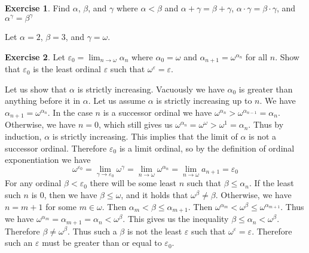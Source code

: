\documentclass{article}
\theoremstyle{definition}
\newtheorem{exer}{Exercise}[section]
\newlength{\defparindent}
\newenvironment{answer}
    {\begin{mdframed}[backgroundcolor=gray!15, linewidth=0pt] \setlength{\parindent}{\defparindent}}
    {\end{mdframed}}
\begin{document}
\begin{exer}
    Find $\alpha$, $\beta$, and $\gamma$ where 
    $\alpha < \beta$ and $\alpha + \gamma = \beta + \gamma$, $\alpha \cdot \gamma = \beta \cdot \gamma$, and $\alpha^\gamma = \beta^\gamma$
    \begin{answer}
        Let $\alpha = 2$, $\beta = 3$, and $\gamma = \omega$.
    \end{answer}
\end{exer}

\begin{exer}
    Let $\varepsilon_0 = \lim_{n \to \omega} \alpha_n$ where $\alpha_0 = \omega$ and $\alpha_{n + 1} = \omega^{\alpha_n}$ for all $n$. Show that $\varepsilon_0$ is the least ordinal $\varepsilon$ such that $\omega^\varepsilon = \varepsilon$.
    \begin{answer}
        Let us show that $\alpha$ is strictly increasing. Vacuously we have $\alpha_0$ is greater than anything before it in $\alpha$. Let us assume $\alpha$ is strictly increasing up to $n$. We have $\alpha_{n + 1} = \omega^{\alpha_{n}}$. In the case $n$ is a successor ordinal we have $\omega^{\alpha_{n}} > \omega^{\alpha_{n - 1}} = \alpha_n$. Otherwise, we have $n = 0$, which still gives us $\omega^{\alpha_{n}} = \omega^\omega > \omega^{1} = \alpha_n$. Thus by induction, $\alpha$ is strictly increasing. This implies that the limit of $\alpha$ is not a successor ordinal. Therefore $\varepsilon_0$ is a limit ordinal, so by the definition of ordinal exponentiation we have 
        \[
            \omega^{\varepsilon_0} 
            =
            \lim_{\gamma \to \varepsilon_0} \omega^\gamma 
            =
            \lim_{n \to \omega} \omega^{\alpha_n}
            =
            \lim_{n \to \omega} a_{n + 1}
            =
            \varepsilon_0  
        \]
        For any ordinal $\beta < \varepsilon_0$ there will be some least $n$ such that $\beta \le \alpha_n$. If the least such $n$ is $0$, then we have $\beta \le \omega$, and it holds that $\omega^\beta \ne \beta$. Otherwise, we have $n = m + 1$ for some $m \in \omega$. Then $\alpha_m < \beta \le \alpha_{m + 1}$. Then $\omega^{\alpha_m} < \omega^{\beta} \le \omega^{\alpha_{m + 1}}$. Thus we have $\omega^{\alpha_m} = \alpha_{m + 1} = \alpha_n < \omega^\beta$. This gives us the inequality $\beta \le \alpha_n < \omega^\beta$. Therefore $\beta \ne \omega^\beta$. Thus such a $\beta$ is not the least $\varepsilon$ such that $\omega^\varepsilon = \varepsilon$. Therefore such an $\varepsilon$ must be greater than or equal to $\varepsilon_0$.
    \end{answer} 
\end{exer}
\end{document}
